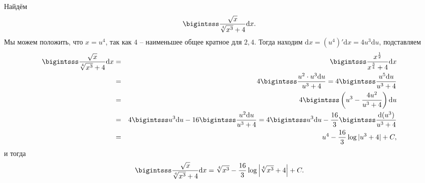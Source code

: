 \begin{example}
    Найдём 
    \[
     \bigintsss \frac{\sqrt{x}}{\sqrt[4]{x^3} +4} \mathrm{d}x.
    \]
Мы можем положить, что $x = u^4$, так как $4$ -- наименьшее общее кратное для $2,4$. Тогда находим $\mathrm{d}x = (u^4)'\mathrm{d}x = 4u^3 \mathrm{d}u$, подставляем
\begin{eqnarray*}
    \bigintsss \frac{\sqrt{x}}{\sqrt[4]{x^3} +4} \mathrm{d}x &=& \bigintsss \frac{x^{\frac{1}{2}}}{x^{\frac{3}{4}}+4} \mathrm{d}x \\
    &=& 4 \bigintsss \frac{u^2 \cdot u^3 \mathrm{d}u}{u^3+4} = 4 \bigintsss \frac{u^5\mathrm{d}u}{u^3+4} \\
    &=& 4 \bigintsss \left(u^3 - \frac{4u^2}{u^3+4} \right)\mathrm{d}u \\
    &=& 4\bigintsss u^3 \mathrm{d}u - 16 \bigintsss\frac{u^2 \mathrm{d}u}{u^3 +4} = 4\bigintsss u^3 \mathrm{d}u - \frac{16}{3} \bigintsss\frac{\mathrm{d}(u^3)}{u^3 +4} \\
    &=& u^4 - \frac{16}{3} \log |u^3 + 4| +C,
\end{eqnarray*}
и тогда
 \[
     \bigintsss \frac{\sqrt{x}}{\sqrt[4]{x^3} +4} \mathrm{d}x = \sqrt[4]{x^3} - \frac{16}{3} \log \left| \sqrt[4]{x^3} + 4 \right| + C.
    \]
\end{example}




